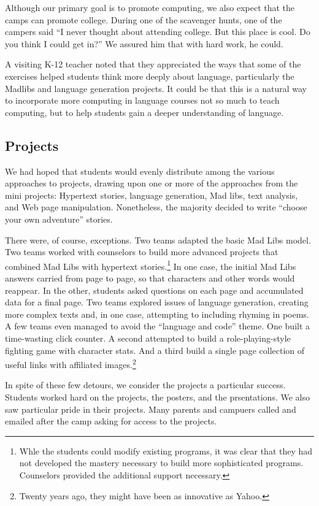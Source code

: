 Although our primary goal is to promote computing, we also expect
that the camps can promote college.  During one of the scavenger
hunts, one of the campers said ``I never thought about attending
college.  But this place is cool.  Do you think I could get in?''
We assured him that with hard work, he could.

A visiting K-12 teacher noted that they appreciated the ways that
some of the exercises helped students think more deeply about
language, particularly the Madlibs and language generation projects.
It could be that this is a natural way to incorporate more computing
in language courses not so much to teach computing, but to help
students gain a deeper understanding of language.

\subsection{Projects}

We had hoped that students would evenly distribute among the various
approaches to projects, drawing upon one or more of the approaches
from the mini projects: Hypertext stories, language generation, Mad
libs, text analysis, and Web page manipulation.  Nonetheless, the
majority decided to write ``choose your own adventure'' stories.

There were, of course, exceptions.  Two teams adapted the basic Mad
Libs model.  Two teams worked with counselors to build more advanced
projects that combined Mad Libs with hypertext stories.\footnote{Whle
the students could modify existing programs, it was clear that they
had not developed the mastery necessary to build more sophisticated
programs.  Counselors provided the additional support necessary.}
In one case, the initial Mad Libs answers carried from page to page,
so that characters and other words would reappear.  In the other,
students asked questions on each page and accumulated data for a
final page.  Two teams explored issues of language generation,
creating more complex texts and, in one case, attempting to including
rhyming in poems.  
A few teams even managed to avoid the ``language and code'' theme.
One built a time-wasting click counter.  A second attempted to build
a role-playing-style fighting game with character stats.  And a
third build a single page collection of useful links with affiliated
images.\footnote{Twenty years ago, they might have been as
innovative as Yahoo.}

In spite of these few detours, we consider the projects a particular
success.  Students worked hard on the projects, the posters, and
the prsentations.  We also saw particular pride in their projects.
Many parents and campuers called and emailed after the camp asking
for access to the projects.

